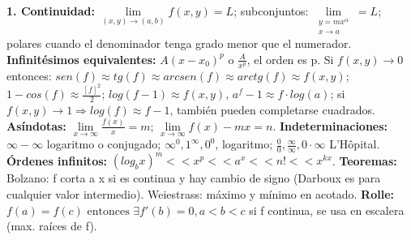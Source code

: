 \documentclass[a4paper, landscape, 11pt]{article}
\begin{document}
\textbf{1. Continuidad:} $\lim\limits_{(x,y) \rightarrow (a,b)} f(x,y) = L$; subconjuntos: $\lim\limits_{\substack{y=mx^\alpha \\ x \rightarrow a}} = L$; polares cuando el denominador tenga grado menor que el numerador. \textbf{Infinitésimos equivalentes:} $A(x-x_{0})^{p}$ o $\frac{A}{x^{p}}$, el orden es p. Si $f(x,y) \rightarrow 0$ entonces: $sen(f) \approx tg(f) \approx arcsen(f) \approx arctg(f) \approx f(x,y)$; $1- cos(f) \approx \frac{[f]^2}{2}$; $ log(f - 1) \approx f(x,y)$, $ a^{f} - 1 \approx f \cdot log(a)$; si $f(x,y) \rightarrow 1 \Rightarrow log(f) \approx f - 1$, también pueden completarse cuadrados. \textbf{Asíndotas:} $\lim\limits_{x \rightarrow \infty} \frac{f(x)}{x} = m$; $\lim\limits_{x \rightarrow \infty} f(x) - mx = n$. \textbf{Indeterminaciones:} $\infty - \infty$ logaritmo o conjugado; $\infty^{0}, 1^{\infty}, 0^{0}$, logaritmo; $\frac{0}{0}, \frac{\infty}{\infty}, 0 \cdot \infty$ L'Hôpital. \textbf{Órdenes infinitos:} $(log_{b} x)^{m}<< x^{p} << a^{x} << n! << x^{kx}$. \textbf{Teoremas:} Bolzano: f corta a x si es continua y hay cambio de signo (Darboux es para cualquier valor intermedio). Weiestrass: máximo y mínimo en acotado. \textbf{Rolle:} $f(a) = f(c) \text{ entonces } \exists f'(b) = 0, a<b<c$ si f continua, se usa en escalera (max. raíces de f).
\\
\end{document}
